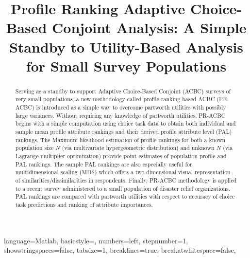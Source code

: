 \documentclass[a4paper, 12pt]{article}
\title {Profile Ranking Adaptive Choice-Based Conjoint Analysis: A Simple Standby to Utility-Based Analysis for Small Survey Populations}
\author[1]{}
\date{}
\begin{document}
\lstset
{ %
    language=Matlab,
    basicstyle=\scriptsize,
    numbers=left,
    stepnumber=1,
    showstringspaces=false,
    tabsize=1,
    breaklines=true,
    breakatwhitespace=false,
}
\maketitle
\hrulefill



 \vspace{.7in}

 \begin{abstract}
Serving as a standby to support Adaptive Choice-Based Conjoint (ACBC) surveys of very small populations, a new methodology called profile ranking based ACBC (PR-ACBC) is introduced as a simple way to overcome partworth utilities with possibly large variances. Without requiring any knowledge of partworth utilities, PR-ACBC begins with a simple computation using choice task data to obtain both individual and sample mean profile attribute rankings and their derived profile attribute level (PAL) rankings. The Maximum likelihood estimation of profile rankings for both a known population size $N$ (via multivariate hypergeometric distribution) and unknown $N$ (via Lagrange multiplier optimization) provide point estimates of population profile and PAL rankings.  The sample PAL rankings are also especially useful  for  multidimensional scaling (MDS) which offers a two-dimensional visual representation of similarities/dissimilarities in respondents.  Finally, PR-ACBC methodology is applied to a recent survey administered to  a small population of disaster relief organizations.  PAL rankings are compared with partworth utilities with respect to accuracy of choice task predictions and ranking of attribute importances.

\end{abstract}


\end{document}

